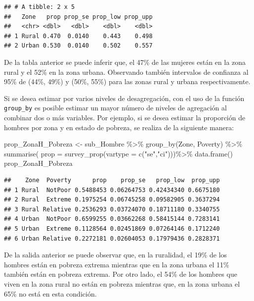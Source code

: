 \documentclass[
  12pt,
]{book}
\newenvironment{Shaded}{\begin{snugshade}}{\end{snugshade}}
\newcommand{\AttributeTok}[1]{\textcolor[rgb]{0.77,0.63,0.00}{#1}}
\newcommand{\FunctionTok}[1]{\textcolor[rgb]{0.00,0.00,0.00}{#1}}
\newcommand{\NormalTok}[1]{#1}
\newcommand{\OtherTok}[1]{\textcolor[rgb]{0.56,0.35,0.01}{#1}}
\newcommand{\SpecialCharTok}[1]{\textcolor[rgb]{0.00,0.00,0.00}{#1}}
\newcommand{\StringTok}[1]{\textcolor[rgb]{0.31,0.60,0.02}{#1}}
\begin{document}
\begin{verbatim}
## # A tibble: 2 x 5
##   Zone   prop prop_se prop_low prop_upp
##   <chr> <dbl>   <dbl>    <dbl>    <dbl>
## 1 Rural 0.470  0.0140    0.443    0.498
## 2 Urban 0.530  0.0140    0.502    0.557
\end{verbatim}

De la tabla anterior se puede inferir que, el 47\% de las mujeres están en la zona rural y el 52\% en la zona urbana. Observando también intervalos de confianza al 95\% de (44\%, 49\%) y (50\%, 55\%) para las zonas rural y urbana respectivamente.

Si se desea estimar por varios niveles de desagregación, con el uso de la función \texttt{group\_by} es posible estimar un mayor número de niveles de agregación al combinar dos o más variables. Por ejemplo, si se desea estimar la proporción de hombres por zona y en estado de pobreza, se realiza de la siguiente manera:

\begin{Shaded}
\begin{Highlighting}[]
\NormalTok{prop\_ZonaH\_Pobreza }\OtherTok{\textless{}{-}}\NormalTok{ sub\_Hombre }\SpecialCharTok{\%\textgreater{}\%}
                      \FunctionTok{group\_by}\NormalTok{(Zone, Poverty) }\SpecialCharTok{\%\textgreater{}\%} 
                      \FunctionTok{summarise}\NormalTok{(}
                      \AttributeTok{prop =} \FunctionTok{survey\_prop}\NormalTok{(}\AttributeTok{vartype =} \FunctionTok{c}\NormalTok{(}\StringTok{"se"}\NormalTok{,}\StringTok{"ci"}\NormalTok{)))}\SpecialCharTok{\%\textgreater{}\%}
                      \FunctionTok{data.frame}\NormalTok{()}
\NormalTok{prop\_ZonaH\_Pobreza}
\end{Highlighting}
\end{Shaded}

\begin{verbatim}
##    Zone  Poverty      prop    prop_se   prop_low  prop_upp
## 1 Rural  NotPoor 0.5488453 0.06264753 0.42434340 0.6675180
## 2 Rural  Extreme 0.1975254 0.06745258 0.09582905 0.3637294
## 3 Rural Relative 0.2536293 0.03724070 0.18711180 0.3340755
## 4 Urban  NotPoor 0.6599255 0.03662268 0.58415144 0.7283141
## 5 Urban  Extreme 0.1128564 0.02451869 0.07264146 0.1712240
## 6 Urban Relative 0.2272181 0.02604053 0.17979436 0.2828371
\end{verbatim}

De la salida anterior se puede observar que, en la ruralidad, el 19\% de los hombres están en pobreza extrema mientras que en la zona urbana el 11\% también están en pobreza extrema. Por otro lado, el 54\% de los hombres que viven en la zona rural no están en pobreza mientras que, en la zona urbana el 65\% no está en esta condición.
\end{document}
